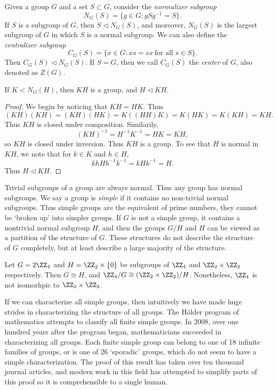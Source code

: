 \begin{example}
    Given a group $G$ and a set $S \subset G$, consider the \emph{normalizer subgroup}
    \[ N_G(S) = \{ g \in G : gSg^{-1} = S \}. \]
    If $S$ is a subgroup of $G$, then $S \lhd N_G(S)$, and moreover, $N_G(S)$ is the largest subgroup of $G$ in which $S$ is a normal subgroup. We can also define the \emph{centralizer subgroup}
    \[ C_G(S) = \{ x \in G: xs = sx\ \text{for all $s \in S$} \}. \]
    Then $C_G(S) \lhd N_G(S)$. If $S = G$, then we call $C_G(S)$ the \emph{center} of $G$, also denoted as $Z(G)$.
\end{example}

\begin{theorem}
    If $K < N_G(H)$, then $KH$ is a group, and $H \lhd KH$.
\end{theorem}
\begin{proof}
    We begin by noticing that $KH = HK$. Thus
    \[ (KH)(KH) = (KH)(HK) = K((HH)K) = K(HK) = K(KH) = KH. \]
    Thus $KH$ is closed under composition. Similarily,
    \[ (KH)^{-1} = H^{-1}K^{-1} = HK = KH, \]
    so $KH$ is closed under inversion. Thus $KH$ is a group. To see that $H$ is normal in $KH$, we note that for $k \in K$ and $h \in H$,
    \[ khHh^{-1}k^{-1} = kHk^{-1} = H. \]
    Thus $H \lhd KH$.
\end{proof}

Trivial subgroups of a group are always normal. Thus any group has normal subgroups. We say a group is \emph{simple} if it contains no non-trivial normal subgroups. Thus simple groups are the equivalent of prime numbers, they cannot be `broken up' into simpler groups. If $G$ is not a simple group, it contains a nontrivial normal subgroup $H$, and then the groups $G/H$ and $H$ can be viewed as a partition of the structure of $G$. These structures do not describe the structure of $G$ completely, but at least describe a large majority of the structure.

\begin{example}
    Let $G = 2 \ZZ_4$ and $H = \ZZ_2 \times \{ 0 \}$ be subgroups of $\ZZ_4$ and $\ZZ_2 \times \ZZ_2$ respectively. Then $G \cong H$, and $\ZZ_4/G \cong (\ZZ_2 \times \ZZ_2) / H$. Nonetheless, $\ZZ_4$ is not isomorhpic to $\ZZ_2 \times \ZZ_2$.
\end{example}

If we can characterize all simple groups, then intuitively we have made huge strides in characterizing the structure of all groups. The H\"{o}lder program of mathematics attempts to classify all finite simple groups. In 2008, over one hundred years after the program began, mathematicians succeeded in characterizing all groups. Each finite simple group can belong to one of 18 infinite families of groups, or is one of 26 `sporadic' groups, which do not seem to have a simple characterization. The proof of this result has taken over ten thousand journal articles, and modern work in this field has attempted to simplify parts of this proof so it is comprehensible to a single human.

